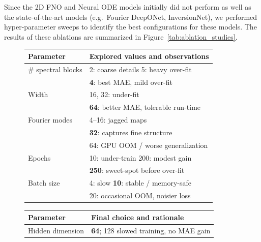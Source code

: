 \documentclass{article}
\begin{document}
Since the 2D FNO and Neural ODE models initially did not perform as well as the state-of-the-art models (e.g.\ Fourier DeepONet, InversionNet), we performed hyper-parameter sweeps to identify the best configurations for these models. The results of these ablations are summarized in Figure~\ref{tab:ablation_studies}.


\vspace{-4pt}
\begin{figure}
\centering
\small
\setlength{\tabcolsep}{3pt}
\renewcommand{\arraystretch}{1.05}

\begin{minipage}[t]{0.48\linewidth}
\label{tab:fno_ablate}
\begin{tabularx}{\linewidth}{@{}l X@{}}
\toprule
\textbf{Parameter} & \textbf{Explored values and observations}\\
\midrule
\# spectral blocks & 2: coarse details \hfill 5: heavy over-fit \\
                   & \textbf{4}: best MAE, mild over-fit \\[2pt]

Width & 16, 32: under-fit \\
      & \textbf{64}: better MAE, tolerable run-time \\[2pt]

Fourier modes & 4–16: jagged maps \\
              & \textbf{32}: captures fine structure \\
              & 64: GPU OOM / worse generalization \\[2pt]

Epochs & 10: under-train \hfill 200: modest gain \\
       & \textbf{250}: sweet-spot before over-fit \\[2pt]

Batch size & 4: slow \hfill \textbf{10}: stable / memory-safe \\
           & 20: occasional OOM, noisier loss \\
\bottomrule
\end{tabularx}
\end{minipage}\hfill
%
\begin{minipage}[t]{0.48\linewidth}
\label{tab:ode_ablate}
\begin{tabularx}{\linewidth}{@{}l X@{}}
\toprule
\textbf{Parameter} & \textbf{Final choice and rationale}\\
\midrule
Hidden dimension & \textbf{64}; 128 slowed training, no MAE gain \\[2pt]


\end{tabularx}
\end{minipage}
\end{figure}
\end{document}
